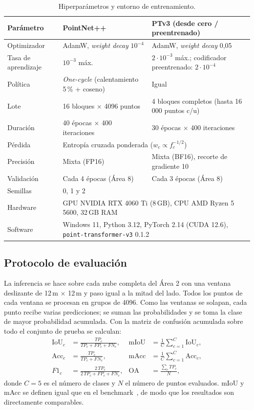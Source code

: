 \documentclass[5p]{elsarticle}
\begin{document}
\begin{table}[t]
\centering
\caption{Hiperparámetros y entorno de entrenamiento.}\label{tab:hiper}
\footnotesize
\setlength{\tabcolsep}{4pt}
\begin{tabular}{@{}p{2.6cm}p{4.6cm}p{4.6cm}@{}}
\toprule
Parámetro & PointNet++ & PTv3 (desde cero / preentrenado) \\
\midrule
Optimizador & AdamW, \emph{weight decay} $10^{-4}$ & AdamW, \emph{weight decay} 0,05 \\
Tasa de aprendizaje & $10^{-3}$ máx. & $2\cdot10^{-3}$ máx.; codificador preentrenado: $2\cdot10^{-4}$ \\
Política & \emph{One-cycle} (calentamiento 5\,\% + coseno) & Igual \\
Lote & 16 bloques $\times$ 4096 puntos & 4 bloques completos (hasta 16\,000 puntos c/u) \\
Duración & 40 épocas $\times$ 400 iteraciones & 30 épocas $\times$ 400 iteraciones \\
Pérdida & \multicolumn{2}{l}{Entropía cruzada ponderada ($w_c \propto f_c^{-1/2}$)} \\
Precisión & Mixta (FP16) & Mixta (BF16), recorte de gradiente 10 \\
Validación & Cada 4 épocas (Área 8) & Cada 3 épocas (Área 8) \\
Semillas & \multicolumn{2}{l}{0, 1 y 2} \\
\midrule
Hardware & \multicolumn{2}{l}{GPU NVIDIA RTX 4060 Ti (8\,GB), CPU AMD Ryzen 5 5600, 32\,GB RAM} \\
Software & \multicolumn{2}{l}{Windows 11, Python 3.12, PyTorch 2.14 (CUDA 12.6), \texttt{point-transformer-v3} 0.1.2} \\
\bottomrule
\end{tabular}
\end{table}

\subsection{Protocolo de evaluación}

La inferencia se hace sobre cada nube completa del Área 2 con una ventana deslizante de 12\,m $\times$ 12\,m y paso igual a la mitad del lado. Todos los puntos de cada ventana se procesan en grupos de 4096. Como las ventanas se solapan, cada punto recibe varias predicciones; se suman las probabilidades y se toma la clase de mayor probabilidad acumulada. Con la matriz de confusión acumulada sobre todo el conjunto de prueba se calculan:
\begin{align}
\mathrm{IoU}_c &= \frac{TP_c}{TP_c+FP_c+FN_c}, & \mathrm{mIoU} &= \frac{1}{C}\sum_{c=1}^{C}\mathrm{IoU}_c, \\
\mathrm{Acc}_c &= \frac{TP_c}{TP_c+FN_c}, & \mathrm{mAcc} &= \frac{1}{C}\sum_{c=1}^{C}\mathrm{Acc}_c, \\
F1_c &= \frac{2\,TP_c}{2\,TP_c+FP_c+FN_c}, & \mathrm{OA} &= \frac{\sum_c TP_c}{N},
\end{align}
donde $C=5$ es el número de clases y $N$ el número de puntos evaluados. mIoU y mAcc se definen igual que en el benchmark~\cite{Le2026}, de modo que los resultados son directamente comparables.
\end{document}
